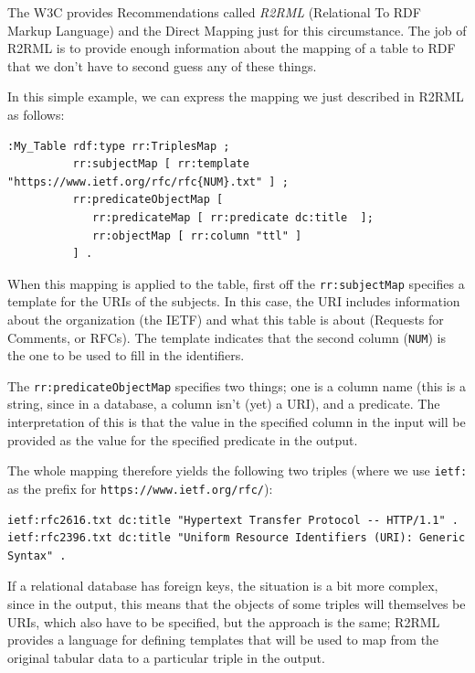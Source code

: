 The W3C provides Recommendations called \emph{R2RML} (Relational To RDF Markup Language) \cite{Sundara:12:RRR}
and the Direct Mapping \cite{Bertails:12:ADM}
just for this circumstance.  The job of R2RML is to provide enough information about 
the mapping of a table to RDF that we don't have to second guess any of these things. 

In this simple example, we can express the mapping we just described in R2RML as follows: 

\begin{lstlisting}
:My_Table rdf:type rr:TriplesMap ;
          rr:subjectMap [ rr:template "https://www.ietf.org/rfc/rfc{NUM}.txt" ] ;
          rr:predicateObjectMap [
             rr:predicateMap [ rr:predicate dc:title  ];
             rr:objectMap [ rr:column "ttl" ]
          ] .
\end{lstlisting}

When this mapping is applied to the table, first off the \texttt{rr:subjectMap} 
specifies a template for the URIs of the subjects.  In this case, the URI 
includes information about the organization (the IETF) and what this table is
about  (Requests for Comments, or RFCs).  The template indicates that the second 
column (\texttt{NUM}) is the one to be used to fill in the identifiers. 

The \texttt{rr:predicateObjectMap} specifies two things; one is a column name 
(this is a string, since in a database, a column isn't (yet) a URI), and a predicate. 
The interpretation of this is that the value in the specified column in the input will be 
provided as the value for the specified predicate in the output. 

The whole mapping therefore yields the following two triples (where we use \texttt{ietf:} as 
the prefix for \texttt{https://www.ietf.org/rfc/}):

\begin{lstlisting}
ietf:rfc2616.txt dc:title "Hypertext Transfer Protocol -- HTTP/1.1" .
ietf:rfc2396.txt dc:title "Uniform Resource Identifiers (URI): Generic Syntax" .
\end{lstlisting}

If a relational database has foreign keys, the situation is a bit more complex, since 
in the output, this means that the objects of some triples will themselves be 
URIs, which also have to be specified, but the approach is the same; R2RML provides
a language for defining templates that will be used to map from the original tabular 
data to a particular triple in the output. 

